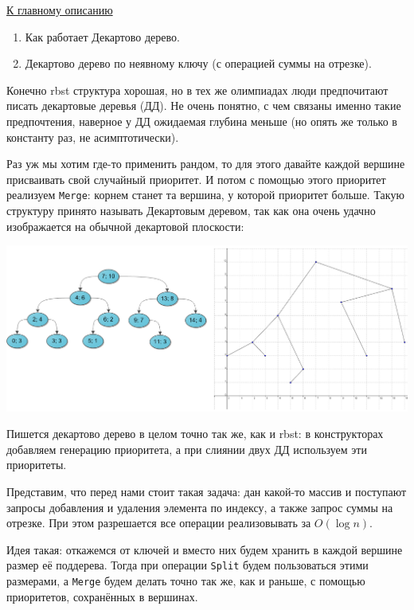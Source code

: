 \label{md2tex9}
\hyperref[md2texREADME]{К главному описанию}


\begin{enumerate}
    \item Как работает Декартово дерево.
    \item Декартово дерево по неявному ключу (с операцией суммы на отрезке).
\end{enumerate}


Конечно rbst структура хорошая, но в тех же олимпиадах люди предпочитают писать декартовые деревья (ДД). Не очень понятно, с чем связаны именно такие предпочтения, наверное у ДД ожидаемая глубина меньше (но опять же только в константу раз, не асимптотически).


Раз уж мы хотим где-то применить рандом, то для этого давайте каждой вершине присваивать свой случайный приоритет. И потом с помощью этого приоритет реализуем \texttt{Merge}: корнем станет та вершина, у которой приоритет больше. Такую структуру принято называть Декартовым деревом, так как она очень удачно изображается на обычной декартовой плоскости:

\includegraphics[scale=0.4]{lessons/9-treap.png}

Пишется декартово дерево в целом точно так же, как и rbst: в конструкторах добавляем генерацию приоритета, а при слиянии двух ДД используем эти приоритеты.


Представим, что перед нами стоит такая задача: дан какой-то массив и поступают запросы добавления и удаления элемента по индексу, а также запрос суммы на отрезке. При этом разрешается все операции реализовывать за $O(\log n)$.

Идея такая: откажемся от ключей и вместо них будем хранить в каждой вершине размер её поддерева. Тогда при операции \texttt{Split} будем пользоваться этими размерами, а \texttt{Merge} будем делать точно так же, как и раньше, с помощью приоритетов, сохранённых в вершинах.

